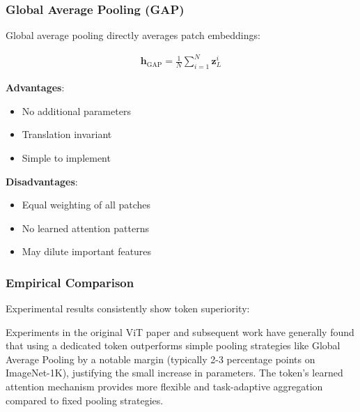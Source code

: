 \subsubsection{Global Average Pooling (GAP)}

Global average pooling directly averages patch embeddings:

\begin{align}
\mathbf{h}_{\text{GAP}} = \frac{1}{N} \sum_{i=1}^{N} \mathbf{z}_L^i
\end{align}

\textbf{Advantages}:
\begin{itemize}
\item No additional parameters
\item Translation invariant
\item Simple to implement
\end{itemize}

\textbf{Disadvantages}:
\begin{itemize}
\item Equal weighting of all patches
\item No learned attention patterns
\item May dilute important features
\end{itemize}

\subsubsection{Empirical Comparison}

Experimental results consistently show \cls{} token superiority:

Experiments in the original ViT paper and subsequent work have generally found that using a dedicated \cls{} token outperforms simple pooling strategies like Global Average Pooling by a notable margin (typically 2-3 percentage points on ImageNet-1K), justifying the small increase in parameters. The \cls{} token's learned attention mechanism provides more flexible and task-adaptive aggregation compared to fixed pooling strategies.

